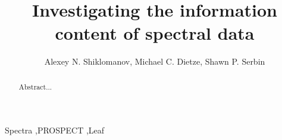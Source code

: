 \documentclass{elsarticle}
\begin{document}
\begin{frontmatter} %

\title{Investigating the information content of spectral data}
\author[ANS,MCD,SPS]{Alexey N. Shiklomanov, Michael C. Dietze, Shawn P. Serbin}
\address[ANS,MCD]{Dept. of Earth and Environment, Boston University}
\address[SPS]{Brookhaven National Lab}

\begin{abstract}
Abstract...
\end{abstract}

\begin{keyword}
Spectra \sep PROSPECT \sep Leaf
\end{keyword}

\end{frontmatter}

\linenumbers %









\end{document}
